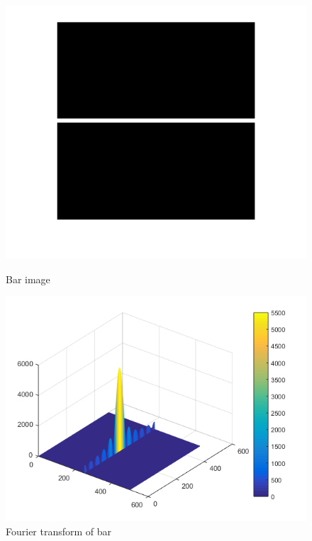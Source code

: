 \begin{figure}[H]
	\centering
	\begin{minipage}[t]{0.4\textwidth}
		\includegraphics[width=\textwidth]{images/bar.png}
		\caption{Bar image}
		\label{fig:bar}
	\end{minipage}
	\begin{minipage}[t]{0.4\textwidth}
		\includegraphics[width=\textwidth]{images/fouriertrafobar.png}
		\caption{Fourier transform of bar}
		\label{fig:fouriertrafobar}
	\end{minipage}
\end{figure}

